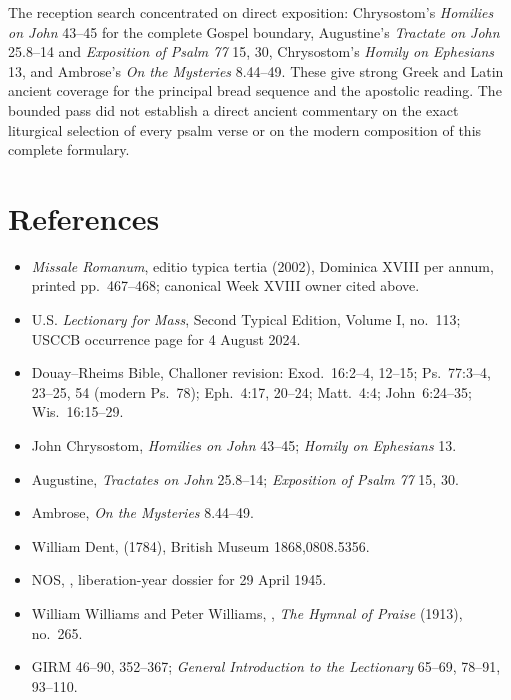 The reception search concentrated on direct exposition: Chrysostom's
\emph{Homilies on John} 43--45 for the complete Gospel boundary, Augustine's
\emph{Tractate on John} 25.8--14 and \emph{Exposition of Psalm 77} 15, 30,
Chrysostom's \emph{Homily on Ephesians} 13, and Ambrose's \emph{On the
Mysteries} 8.44--49. These give strong Greek and Latin ancient coverage for
the principal bread sequence and the apostolic reading. The bounded pass did
not establish a direct ancient commentary on the exact liturgical selection
of every psalm verse or on the modern composition of this complete formulary.

\section*{References}

{\scriptsize
\begin{itemize}[itemsep=0.1em,topsep=0.2em]
\item \emph{Missale Romanum}, editio typica tertia (2002), Dominica XVIII per
annum, printed pp.~467--468; canonical Week XVIII owner cited above.
\item U.S. \emph{Lectionary for Mass}, Second Typical Edition, Volume I,
no.~113; USCCB occurrence page for 4 August 2024.
\item Douay--Rheims Bible, Challoner revision: Exod.~16:2--4, 12--15;
Ps.~77:3--4, 23--25, 54 (modern Ps.~78); Eph.~4:17, 20--24; Matt.~4:4;
John~6:24--35; Wis.~16:15--29.
\item John Chrysostom, \emph{Homilies on John} 43--45; \emph{Homily on
Ephesians} 13.
\item Augustine, \emph{Tractates on John} 25.8--14; \emph{Exposition of
Psalm 77} 15, 30.
\item Ambrose, \emph{On the Mysteries} 8.44--49.
\item William Dent,  (1784), British Museum 1868,0808.5356.
\item NOS, , liberation-year dossier for 29 April 1945.
\item William Williams and Peter Williams, , \emph{The Hymnal of Praise} (1913), no.~265.
\item GIRM 46--90, 352--367; \emph{General Introduction to the Lectionary}
65--69, 78--91, 93--110.
\end{itemize}
}

